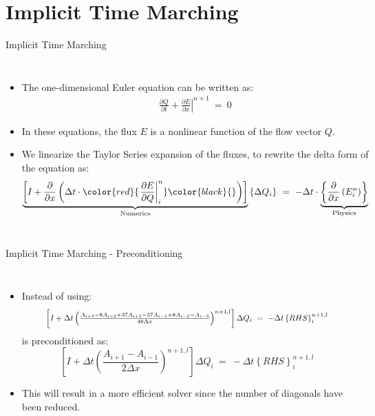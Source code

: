 \section{Implicit Time Marching}
\begin{frame}{Implicit Time Marching}
\begin{columns}
        \begin{itemize}
        	\item The one-dimensional Euler equation can be written as:
 				\begin{equation}
					\begin{split}
						\label{eq:Implicit_Scheme}
  						\frac{\partial{Q}}{\partial{t}} +\left.\frac{\partial{E}}{\partial{x}}\right|^{n+1}~=~0
					\end{split}
				\end{equation}
  			\item In these equations, the flux $E$ is a nonlinear function of the flow vector $Q$.
        	\item We linearize the Taylor Series expansion of the fluxes, to rewrite the delta form of the equation as:
\begin{equation}\underbrace{\left[I+\frac{\partial}{\partial{x}}\left(\Delta{t}\cdot \color{red}{\left.\frac{\partial{E}}{\partial{Q}}\right|_{i}^n}\color{black}{} \right)\right]}_{\text{Numerics}}\left\{\Delta{Q_{i}}\right\}~=~-\Delta{t}\cdot \underbrace{\left\{\frac{\partial}{\partial{x}}\left(E_{i}^n \right)\right\}}_{\text{Physics}}
\end{equation}
        \end{itemize}   
    \end{columns}
\end{frame}


\begin{frame}{Implicit Time Marching - Preconditioning}
\begin{columns}
        \begin{itemize}
		\item Instead of using:
\begin{equation}
	\label{eq:RDRP_NS}\resizebox{0.85\hsize}{!}{$%
  		\left[I+\Delta{t}\left(\frac{A_{i+3}-8A_{i+2}+37A_{i+1}-37A_{i-1}+8A_{i-2}-A_{i-3}}{48\Delta{x}}\right)^{n+1,l}\right]\Delta{Q}_i~=~-\Delta{t}\left\{RHS\right\}_i^{n+1, l}$}
\end{equation}
is preconditioned as:
\begin{equation}
	\label{eq:TriDi_NS}
  		\left[I+\Delta{t}\left(\frac{A_{i+1}-A_{i-1}}{2\Delta{x}}\right)^{n+1,l}\right]\Delta{Q}_i~=~-\Delta{t}\left\{RHS\right\}_i^{n+1, l}
\end{equation}
		\item This will result in a more efficient solver since the number of diagonals have been reduced.
        \end{itemize}  
    \end{columns}
\end{frame}

